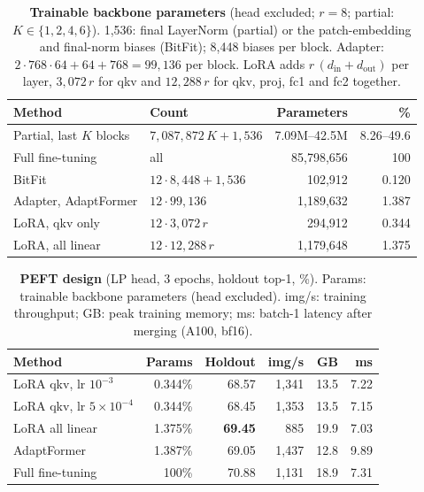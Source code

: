 \begin{table}[H]
  \caption{\textbf{Trainable backbone parameters} (head excluded; $r = 8$; partial: $K \in \{1, 2, 4, 6\}$).
  1,536: final LayerNorm (partial) or the patch-embedding and final-norm biases (BitFit); 8,448 biases per block.
  Adapter: $2 \cdot 768 \cdot 64 + 64 + 768 = 99{,}136$ per block.
  LoRA adds $r\,(d_\text{in} + d_\text{out})$ per layer, \ie $3{,}072\,r$ for qkv and $12{,}288\,r$ for qkv, proj, fc1 and fc2 together.}
  \label{tab:params}
  \centering
  \footnotesize
  \begin{tabular}{@{}llrr@{}}
    \toprule
    Method & Count & Parameters & \% \\
    \midrule
    Partial, last $K$ blocks & $7{,}087{,}872\,K + 1{,}536$ & 7.09M--42.5M & 8.26--49.6 \\
    Full fine-tuning & all & 85,798,656 & 100 \\
    BitFit & $12 \cdot 8{,}448 + 1{,}536$ & 102,912 & 0.120 \\
    Adapter, AdaptFormer & $12 \cdot 99{,}136$ & 1,189,632 & 1.387 \\
    LoRA, qkv only & $12 \cdot 3{,}072\,r$ & 294,912 & 0.344 \\
    LoRA, all linear & $12 \cdot 12{,}288\,r$ & 1,179,648 & 1.375 \\
    \bottomrule
  \end{tabular}
\end{table}

\begin{table}[H]
  \caption{\textbf{PEFT design} (LP head, 3 epochs, holdout top-1, \%). Params: trainable backbone parameters (head excluded). img/s: training throughput; GB: peak training memory; ms: batch-1 latency after merging (A100, bf16).}
  \label{tab:peft}
  \centering
  \footnotesize
  \setlength{\tabcolsep}{5pt}
  \begin{tabular}{@{}lrrrrr@{}}
    \toprule
    Method & Params & Holdout & img/s & GB & ms \\
    \midrule
    LoRA qkv, lr $10^{-3}$ & 0.344\% & 68.57 & 1,341 & 13.5 & 7.22 \\
    LoRA qkv, lr $5{\times}10^{-4}$ & 0.344\% & 68.45 & 1,353 & 13.5 & 7.15 \\
    LoRA all linear & 1.375\% & \textbf{69.45} & 885 & 19.9 & 7.03 \\
    AdaptFormer & 1.387\% & 69.05 & 1,437 & 12.8 & 9.89 \\
    \midrule
    Full fine-tuning & 100\% & 70.88 & 1,131 & 18.9 & 7.31 \\
    \bottomrule
  \end{tabular}
\end{table}

